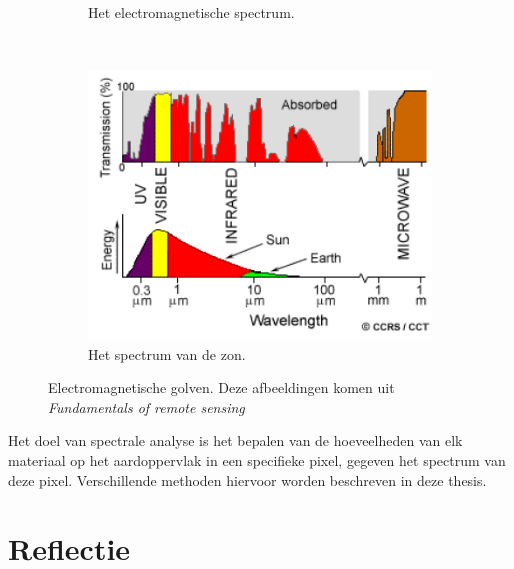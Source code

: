 \documentclass[12pt]{report}
\newcommand{\rulesep}{\unskip\ \vrule height -1ex\ }
\begin{document}
\begin{figure}
\begin{subfigure}[b]{0.2\textwidth}
\caption{Het electromagnetische spectrum. \label{fig:spec}}
\end{subfigure}\rulesep
\begin{subfigure}[b]{0.4\textwidth}
\includegraphics[width=\textwidth]{spec2.PNG}
\caption{Het spectrum van de zon. \label{fig:specs}}
\end{subfigure}
\caption{Electromagnetische golven. Deze afbeeldingen komen uit \textit{Fundamentals of remote sensing\cite{fun}}\label{fig:rs2}}
\end{figure}


Het doel van spectrale analyse is het bepalen van de hoeveelheden van elk materiaal op het aardoppervlak in een specifieke pixel, gegeven het spectrum van deze pixel. Verschillende methoden hiervoor worden beschreven in deze thesis. 

\section{Reflectie} \label{sec:ref}

\end{document}
